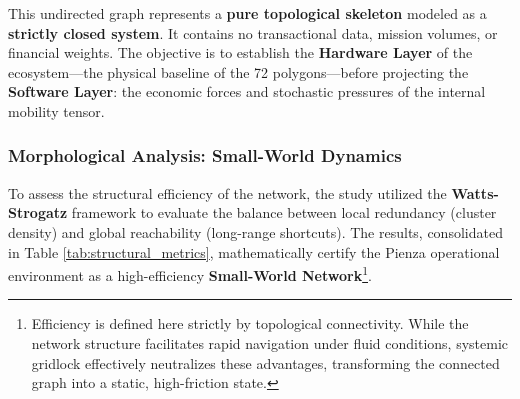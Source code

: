 This undirected graph represents a \textbf{pure topological skeleton} modeled as a \textbf{strictly closed system}. It contains no transactional data, mission volumes, or financial weights. The objective is to establish the \textbf{Hardware Layer} of the ecosystem---the physical baseline of the 72 polygons---before projecting the \textbf{Software Layer}: the economic forces and stochastic pressures of the internal mobility tensor.


\subsubsection{Morphological Analysis: Small-World Dynamics}
To assess the structural efficiency of the network, the study utilized the \textbf{Watts-Strogatz} framework to evaluate the balance between local redundancy (cluster density) and global reachability (long-range shortcuts). The results, consolidated in Table \ref{tab:structural_metrics}, mathematically certify the Pienza operational environment as a high-efficiency \textbf{Small-World Network}\footnote{Efficiency is defined here strictly by topological connectivity. While the network structure facilitates rapid navigation under fluid conditions, systemic gridlock effectively neutralizes these advantages, transforming the connected graph into a static, high-friction state.}.

